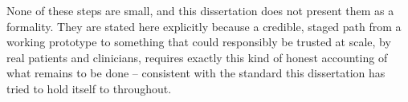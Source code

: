 None of these steps are small, and this dissertation does not present them as a formality. They are stated here explicitly because a credible, staged path from a working prototype to something that could responsibly be trusted at scale, by real patients and clinicians, requires exactly this kind of honest accounting of what remains to be done -- consistent with the standard this dissertation has tried to hold itself to throughout.